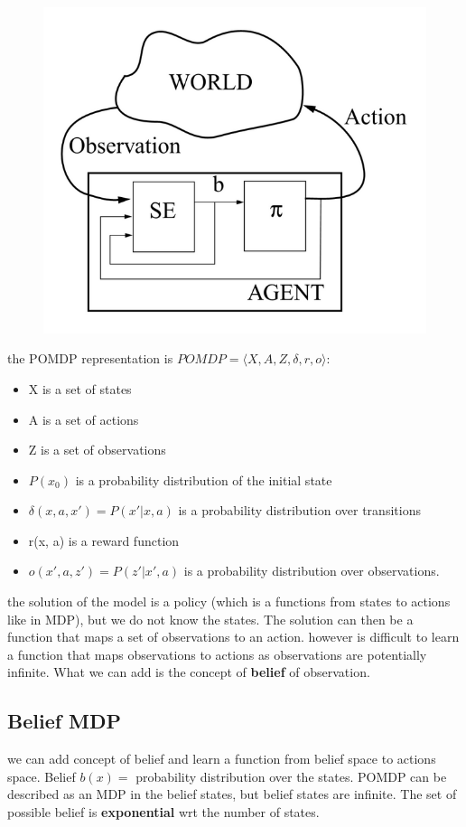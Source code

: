 \begin{figure}[H]
    \centering
    \includegraphics[width=12cm]{images/Reinforcement Learning/POMDP.png}
    \label{fig:pomdp}
\end{figure}

the POMDP representation is $POMDP = \langle X, A, Z, \delta, r, o\rangle$:
\begin{itemize}
    \item X is a set of states
    \item A is a set of actions
    \item Z is a set of observations
    \item $P(x_{0})$ is a probability distribution of the initial state
    \item $\delta(x, a, x') = P(x'|x, a)$ is a probability distribution over transitions
    \item r(x, a) is a reward function
    \item $o(x', a, z') = P(z'|x', a)$ is a probability distribution over observations.
\end{itemize}

the solution of the model is a policy (which is a functions from states to actions like in MDP), but we do not know the states.
The solution can then be a function that maps a set of observations to an action. however is difficult to learn a function that maps observations to actions as observations are potentially infinite. What we can add is the concept of \textbf{belief} of observation.

\subsection{Belief MDP}
we can add concept of belief and learn a function from belief space to actions space.
Belief $b(x) =$ probability distribution over the states. POMDP can be described as an MDP in the belief states, but belief states are infinite.
The set of possible belief is \textbf{exponential} wrt the number of states.

